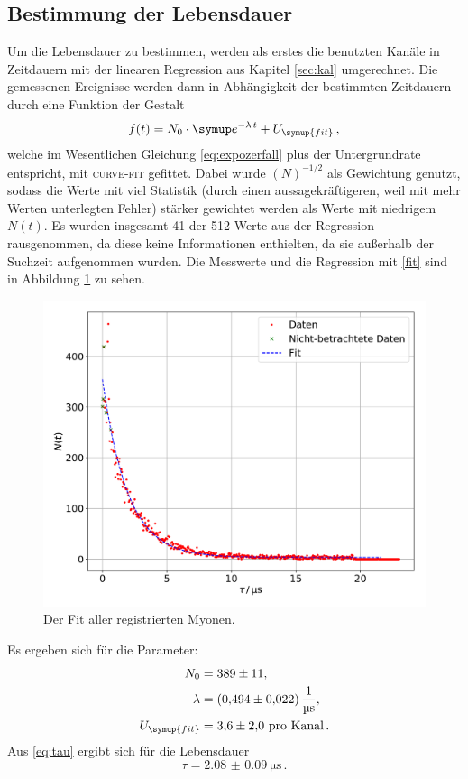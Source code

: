 \documentclass[
  bibliography=totoc,     %
  captions=tableheading,  %
  titlepage=firstiscover, %
]{scrartcl}
\begin{document}
\subsection{Bestimmung der Lebensdauer}
Um die Lebensdauer zu bestimmen, werden als erstes die benutzten Kanäle in
Zeitdauern mit der linearen Regression aus Kapitel \ref{sec:kal} umgerechnet.
Die gemessenen Ereignisse werden dann in Abhängigkeit der bestimmten Zeitdauern
durch eine Funktion der Gestalt
\begin{equation}
  f(t) = N_0 \cdot \symup e^{-\lambda \, t} + U_{\symup{fit}} \, ,
  \label{fit}
\end{equation}
welche im Wesentlichen Gleichung \eqref{eq:expozerfall} plus der Untergrundrate entspricht,
mit \textsc{curve-fit} gefittet. Dabei wurde $(N)^{-1/2}$ als Gewichtung
genutzt, sodass die Werte mit viel Statistik (durch einen aussagekräftigeren, weil
mit mehr Werten unterlegten Fehler) stärker gewichtet werden als Werte mit niedrigem
$N(t)$. Es wurden insgesamt 41 der 512 Werte aus der Regression rausgenommen,
da diese keine Informationen enthielten, da sie außerhalb der Suchzeit aufgenommen wurden.
Die Messwerte und die Regression mit \eqref{fit} sind in
Abbildung \ref{fig:16} zu sehen.

\begin{figure}
  \centering
  \includegraphics[scale=0.5]{fig24.pdf}
  \caption{Der Fit aller registrierten Myonen.}
  \label{fig:16}
\end{figure}
\noindent
Es ergeben sich für die Parameter:
\begin{align}
  N_0 &= \num{389(11)}, \\
  \lambda &= \SI{0.494(22)}{\per\micro\second} \label{dauer}, \\
  U_{\symup{fit}} &= \num{3.6(20)} \ \text{pro Kanal} \label{Untergrund} \, .
\end{align}
Aus \eqref{eq:tau} ergibt sich für die Lebensdauer
\begin{equation}
  \tau = \SI{2.08(9)}{\micro\second} \, .
\end{equation}
\clearpage
\end{document}
